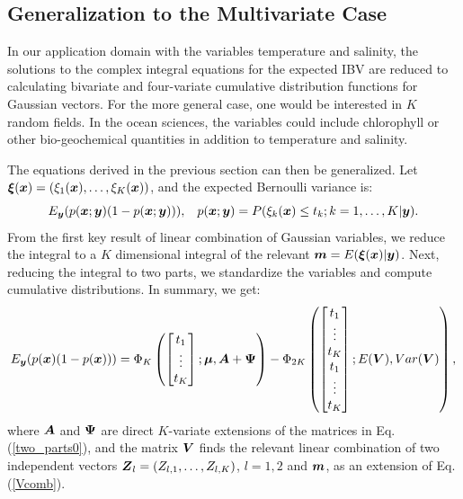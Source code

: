 \documentclass[aoas]{imsart}
\begin{document}
\subsection{Generalization to the Multivariate Case}
\label{gen_k}

In our application domain with the variables temperature and salinity,
the solutions to the complex integral equations for the expected IBV
are reduced to calculating bivariate and four-variate cumulative
distribution functions for Gaussian vectors. For the more general
case, one would be interested in $K$ random fields. In the ocean
sciences, the variables could include chlorophyll or other
bio-geochemical quantities in addition to temperature and salinity.

The equations derived in the previous section can then be generalized. Let
${\boldsymbol \xi}({\boldsymbol x})=(\xi_1({\boldsymbol x}),\ldots,\xi_K({\boldsymbol x}))$, and the expected Bernoulli
variance is:
\begin{equation}\label{two_partsK}
E_{\by}(p(\bx;\by)(1-p(\bx;\by))), \hspace{3mm} p(\bx;\by)=P(\xi_k(\bx) \leq t_k ; k=1,\ldots,K|\by). 
\end{equation}
From the first key result of linear combination of Gaussian variables,
we reduce the integral to a $K$ dimensional integral of the relevant
${\boldsymbol m}=E({\boldsymbol \xi}({\boldsymbol x})|{\boldsymbol y})$. Next, reducing the integral to two parts, we
standardize the variables and compute cumulative distributions.  In
summary, we get:
\begin{equation}\label{two_parts}
E_{\by}(p(\bx)(1-p(\bx))) =  \Phi_K 
\begin{pmatrix}
\begin{bmatrix} t_1\\
\vdots \\
t_K 
\end{bmatrix};
\bmu,\bA+\bPsi 
\end{pmatrix}
- \Phi_{2K} 
\begin{pmatrix}
\begin{bmatrix} t_1\\
\vdots \\
t_K \\
t_1\\
\vdots \\
t_K 
\end{bmatrix};
E(\bV),Var(\bV) 
\end{pmatrix},\nonumber
\end{equation}
where ${\boldsymbol A}$ and ${\boldsymbol \Psi}$ are direct $K$-variate extensions of the
matrices in Eq. (\ref{two_parts0}), and the matrix ${\boldsymbol V}$ finds the
relevant linear combination of two independent vectors
${\boldsymbol Z}_l=(Z_{l,1},\ldots,Z_{l,K})$, $l=1,2$ and ${\boldsymbol m}$, as an extension
of Eq. (\ref{Vcomb}).
\end{document}
